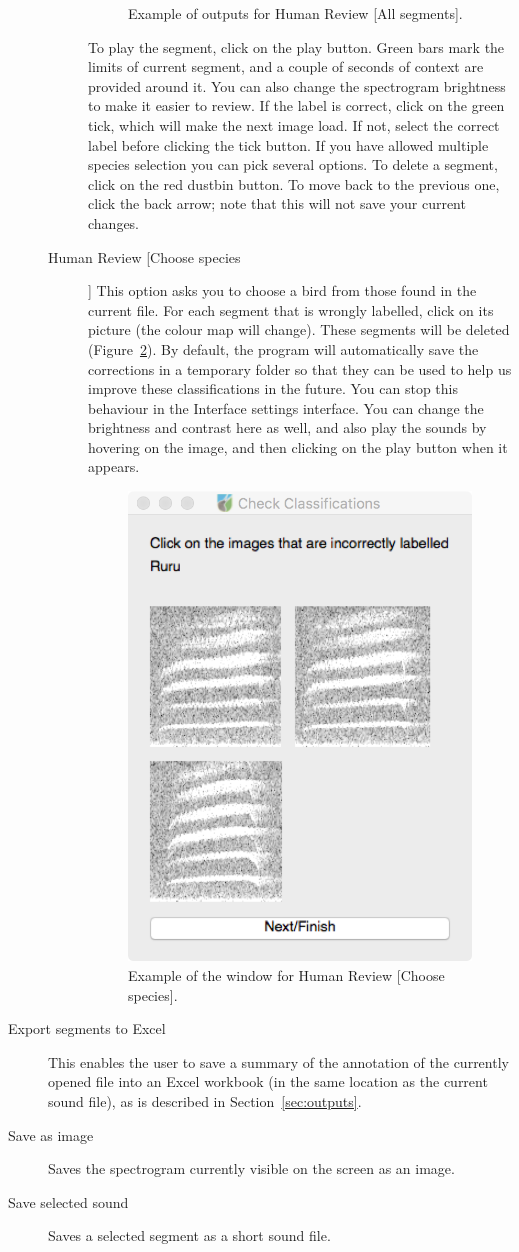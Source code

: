 \documentclass{article}
\begin{document}
\begin{description}
\begin{description}
\begin{figure}
	\caption{Example of outputs for Human Review [All segments].}
	\label{check1}
	\end{figure}
	To play the segment, click on the play button. Green bars mark the limits of current segment, and a couple of seconds of context are provided around it. You can also change the spectrogram brightness to make it easier to review. If the label is correct, click on the green tick, which will make the next image load. If not, select the correct label before clicking the tick button. If you have allowed multiple species selection you can pick several options. To delete a segment, click on the red dustbin button. To move back to the previous one, click the back arrow; note that this will not save your current changes. 
	\item [Human Review [Choose species]] This option asks you to choose a bird from those found in the current file. For each segment that is wrongly labelled, click on its picture (the colour map will change). These segments will be deleted (Figure~\ref{check2}). By default, the program will automatically save the corrections in a temporary folder so that they can be used to help us improve these classifications in the future. You can stop this behaviour in the Interface settings interface. You can change the brightness and contrast here as well, and also play the sounds by hovering on the image, and then clicking on the play button when it appears. 
	\begin{figure}
	\centering
	\includegraphics[width=.4\textwidth]{Figs/Check2}
	\caption{Example of the window for Human Review [Choose species].}
	\label{check2}
	\end{figure}
	\end{description}

\item [Export segments to Excel] This enables the user to save a summary of the annotation of the currently opened file into an Excel workbook (in the same location as the current sound file), as is described in Section~\ref{sec:outputs}. 
\item [Save as image] Saves the spectrogram currently visible on the screen as an image.
\item [Save selected sound] Saves a selected segment as a short sound file.
\end{description}
\end{document}

